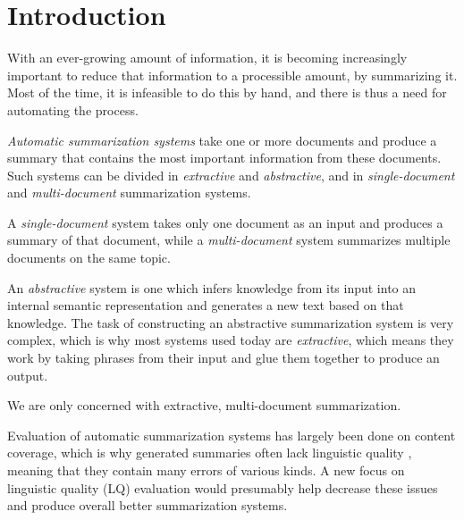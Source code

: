 \documentclass[a4paper,10pt]{scrartcl}
\theoremstyle{style}
\begin{document}


\maketableofcontents

\section{Introduction}

With an ever-growing amount of information, it is becoming increasingly important to reduce that information to a processible amount, by summarizing it. Most of the time, it is infeasible to do this by hand, and there is thus a need for automating the process.

\textit{Automatic summarization systems} take one or more documents and produce a summary that contains the most important information from these documents. Such systems can be divided in \textit{extractive} and \textit{abstractive}, and in \textit{single-document} and \textit{multi-document} summarization systems.

A \textit{single-document} system takes only one document as an input and produces a summary of that document, while a \textit{multi-document} system summarizes multiple documents on the same topic.

An \textit{abstractive} system is one which infers knowledge from its input into an internal semantic representation and generates a new text based on that knowledge. The task of constructing an abstractive summarization system is very complex, which is why most systems used today are \textit{extractive}, which means they work by taking phrases from their input and glue them together to produce an output.

We are only concerned with extractive, multi-document summarization.

Evaluation of automatic summarization systems has largely been done on content coverage, which is why generated summaries often lack linguistic quality \citep{nenkova2011foundations}, meaning that they contain many errors of various kinds. A new focus on linguistic quality (LQ) evaluation would presumably help decrease these issues and produce overall better summarization systems.
\end{document}
